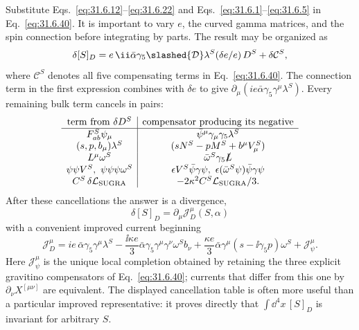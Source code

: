 \begin{enumerate}
  Substitute Eqs.~\eqref{eq:31.6.12}--\eqref{eq:31.6.22} and
  Eqs.~\eqref{eq:31.6.1}--\eqref{eq:31.6.5} in
  Eq.~\eqref{eq:31.6.40}.  It is important to vary \(e\), the curved
  gamma matrices, and the spin connection before integrating by parts.
  The result may be organized as
  \[
    \delta[S]_D=
      e\,\ii\bar\alpha\gamma_5\slashed{\mathcal D}\lambda^S
      (\delta e/e)\,D^S+\delta\mathcal C^S ,
  \]
  where \(\mathcal C^S\) denotes all five compensating terms in
  Eq.~\eqref{eq:31.6.40}.  The connection term in the first expression
  combines with \(\delta e\) to give
  \(\partial_\mu(ie\bar\alpha\gamma_5\gamma^\mu\lambda^S)\).
  Every remaining bulk term cancels in pairs:
  \[
  \begin{array}{c|c}
    \text{term from }\delta D^S&
    \text{compensator producing its negative}\\ \hline
    F^S_{ab}\psi_\mu&\bar\psi^\mu\gamma_\mu\gamma_5\lambda^S\\
    (s,p,b_\mu)\lambda^S&(sN^S-pM^S+b^\mu V_\mu^S)\\
    L^\mu\omega^S&\bar\omega^S\gamma_5\slashed L\\
    \psi\psi V^S,\ \psi\psi\psi\omega^S&
      \epsilon V^S\bar\psi\gamma\psi,\
      \epsilon(\bar\omega^S\psi)\bar\psi\gamma\psi\\
    C^S\,\delta\mathcal L_{\rm SUGRA}&
      -2\kappa^2 C^S\mathcal L_{\rm SUGRA}/3 .
  \end{array}
  \]
  After these cancellations the answer is a divergence,
  \[
    \boxed{\quad
      \delta[S]_D=\partial_\mu\mathscr J_D^\mu(S,\alpha)\quad}
  \]
  with a convenient improved current beginning
  \[
    \mathscr J_D^\mu
      =ie\,\bar\alpha\gamma_5\gamma^\mu\lambda^S
       -\frac{\ii\kappa e}{3}
        \bar\alpha\gamma_5\gamma^\mu\gamma^\nu\omega^S b_\nu
       +\frac{\kappa e}{3}
        \bar\alpha\gamma^\mu(s-\ii\gamma_5p)\omega^S
       +\mathscr J_{\psi}^{\mu}.
  \]
  Here \(\mathscr J_{\psi}^{\mu}\) is the unique local completion
  obtained by retaining the three explicit gravitino compensators of
  Eq.~\eqref{eq:31.6.40}; currents that differ from this one by
  \(\partial_\nu X^{[\mu\nu]}\) are equivalent.  The displayed
  cancellation table is often more useful than a particular improved
  representative: it proves directly that
  \(\int \dd^4x\,[S]_D\) is invariant for arbitrary \(S\).


\end{enumerate}
